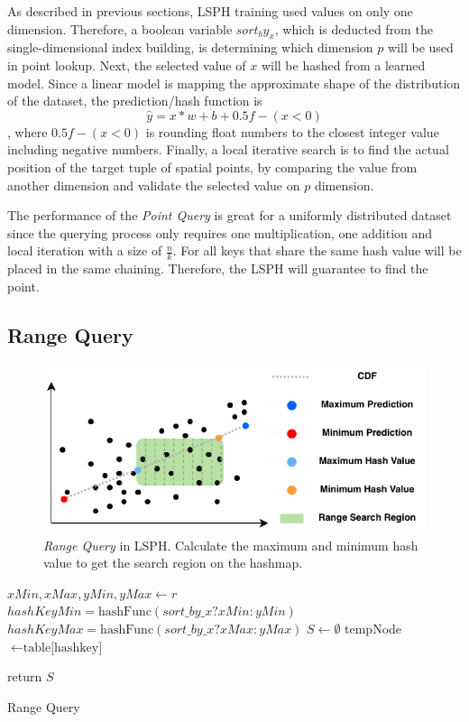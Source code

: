 As described in previous sections, LSPH training used values on only one dimension. Therefore, a boolean variable $sort_by_x$, which is deducted from the single-dimensional index building,  is determining which dimension $p$ will be used in point lookup. Next, the selected value of $x$ will be hashed from a learned model. Since a linear model is mapping the approximate shape of the distribution of the dataset, the prediction/hash function is 
\begin{equation}
\hat{y} = x * w + b + 0.5f - (x<0)
\end{equation}
, where $0.5f - (x<0)$ is rounding float numbers to the closest integer value including negative numbers. Finally, a local iterative search is to find the actual position of the target tuple of spatial points, by comparing the value from another dimension and validate the selected value on $p$ dimension. 

The performance of the \textit{Point Query} is great for a uniformly distributed dataset since the querying process only requires one multiplication, one addition and local iteration with a size of  $\frac{n}{k}$. For all keys that share the same hash value will be placed in the same chaining. Therefore, the LSPH will guarantee to find the point. 


\subsection{Range Query}

\begin{figure}[ht]
\centering
\includegraphics{Figures/range_search.pdf}
\caption{\textit{Range Query} in LSPH. Calculate the maximum and minimum hash value to get the search region on the hashmap.}
\label{fig:range_search}
\end{figure}


\begin{algorithm}[H] \label{range_query}
\SetAlgoLined
{}
 $xMin, xMax, yMin, yMax\leftarrow{r}$\;
 $hashKeyMin = \text{hashFunc}(sort\_by\_x ? xMin : yMin)$\;
 $hashKeyMax = \text{hashFunc}(sort\_by\_x ? xMax : yMax)$\;
 $S\leftarrow{\emptyset}$\;
 {
 tempNode $\leftarrow{\text{table[hashkey]}}$\;
 }
 
 return $S$\;
 \caption{Range Query}
\end{algorithm}



